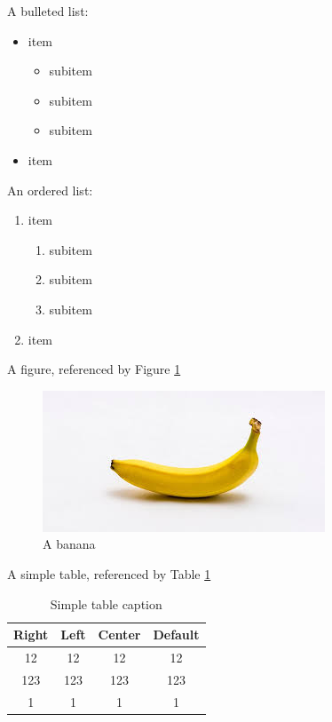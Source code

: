 \documentclass[a4paper, ]{article}
\begin{document}
    A bulleted list:

    \begin{itemize}
        \item item
        \begin{itemize}
            \item subitem
            \item subitem
            \item subitem
        \end{itemize}
        \item item
    \end{itemize}

    An ordered list:

    \begin{enumerate}
        \item item
        \begin{enumerate}
            \item subitem
            \item subitem
            \item subitem
        \end{enumerate}
        \item item
    \end{enumerate}

    A figure, referenced by Figure \ref{fig:banana}

    \begin{figure}[H]
        \centering
        \includegraphics[scale=1.0]{banana.jpg}
        \caption{A banana}
        \label{fig:banana}
    \end{figure}

    A simple table, referenced by Table \ref{tab:my-simple-table}

    \begin{table}[h]
        \caption{Simple table caption}
        \label{tab:my-simple-table}
        \centering
        \begin{tabular}{|c|c|c|c|}
            \hline
            \bfseries{Right} &
            \bfseries{Left} &
            \bfseries{Center} &
            \bfseries{Default} \\
            \hline
            12 &
            12 &
            12 &
            12 \\
            \hline
            123 &
            123 &
            123 &
            123 \\
            \hline
            1 &
            1 &
            1 &
            1 \\
            \hline
        \end{tabular}
    \end{table}
\end{document}

